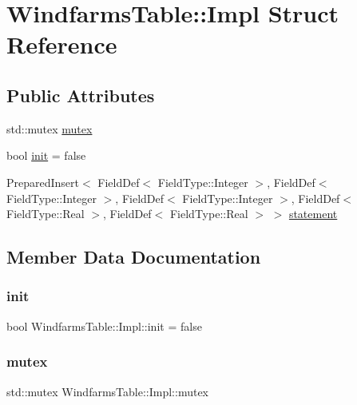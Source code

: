 \hypertarget{struct_windfarms_table_1_1_impl}{}\section{Windfarms\+Table\+::Impl Struct Reference}
\label{struct_windfarms_table_1_1_impl}
\subsection*{Public Attributes}
\begin{DoxyCompactItemize}
\item 
std\+::mutex \mbox{\hyperlink{struct_windfarms_table_1_1_impl_a347507687d63dd3ac08640845edb4678}{mutex}}
\item 
bool \mbox{\hyperlink{struct_windfarms_table_1_1_impl_af5543a5e81dac06cab9ed09cdcf08bef}{init}} = false
\item 
Prepared\+Insert$<$ Field\+Def$<$ Field\+Type\+::\+Integer $>$, Field\+Def$<$ Field\+Type\+::\+Integer $>$, Field\+Def$<$ Field\+Type\+::\+Integer $>$, Field\+Def$<$ Field\+Type\+::\+Real $>$, Field\+Def$<$ Field\+Type\+::\+Real $>$ $>$ \mbox{\hyperlink{struct_windfarms_table_1_1_impl_a9f5129a6d5b5d8e4ec1e5b904e21ef74}{statement}}
\end{DoxyCompactItemize}


\subsection{Member Data Documentation}
\mbox{\label{struct_windfarms_table_1_1_impl_af5543a5e81dac06cab9ed09cdcf08bef}} 
\subsubsection{\texorpdfstring{init}{init}}
{\footnotesize\ttfamily bool Windfarms\+Table\+::\+Impl\+::init = false}

\mbox{\label{struct_windfarms_table_1_1_impl_a347507687d63dd3ac08640845edb4678}} 
\subsubsection{\texorpdfstring{mutex}{mutex}}
{\footnotesize\ttfamily std\+::mutex Windfarms\+Table\+::\+Impl\+::mutex}

